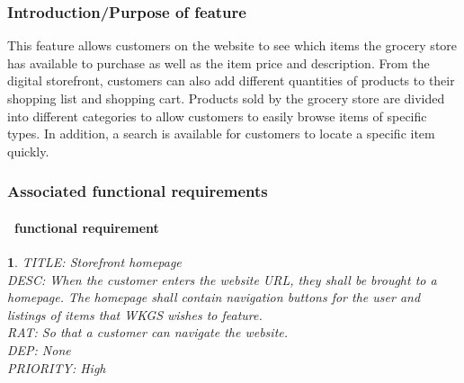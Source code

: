 \documentclass{scrreprt}
\theoremstyle{funreq}
\newtheorem{funreq}{}
\begin{document}
\subsubsection{Introduction/Purpose of feature}
This feature allows customers on the website to see which items the grocery store has available to purchase as well as the item price and description. From the digital storefront, customers can also add different quantities of products to their shopping list and shopping cart. Products sold by the grocery store are divided into different categories to allow customers to easily browse items of specific types. In addition, a search is available for customers to locate a specific item quickly.
\subsubsection{Associated functional requirements}

\paragraph[]{\Subsectionname ~functional requirement }
\begin{funreq}
	\label{store_home}
	TITLE: Storefront homepage\\
	DESC: When the customer enters the website URL, they shall be brought to a homepage. The homepage shall contain navigation buttons for the user and listings of items that WKGS wishes to feature.\\
	RAT: So that a customer can navigate the website.\\
	DEP: None\\
	PRIORITY: High\\
\end{funreq}
\end{document}
